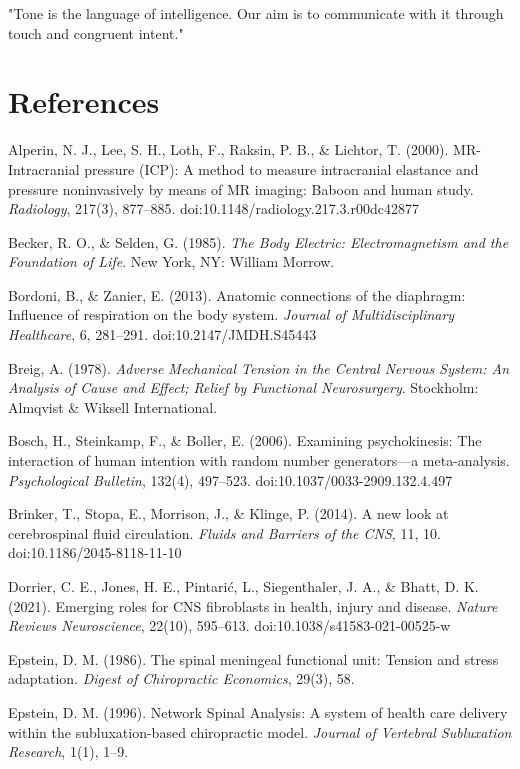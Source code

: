 \documentclass[11pt,letterpaper]{article}
\begin{document}
\begin{pullquotebox}
"Tone is the language of intelligence. Our aim is to communicate with it through touch and congruent intent."
\end{pullquotebox}


\section{References}

Alperin, N. J., Lee, S. H., Loth, F., Raksin, P. B., \& Lichtor, T. (2000). MR-Intracranial pressure (ICP): A method to measure intracranial elastance and pressure noninvasively by means of MR imaging: Baboon and human study. \textit{Radiology}, 217(3), 877–885. doi:10.1148/radiology.217.3.r00dc42877


Becker, R. O., \& Selden, G. (1985). \textit{The Body Electric: Electromagnetism and the Foundation of Life}. New York, NY: William Morrow.


Bordoni, B., \& Zanier, E. (2013). Anatomic connections of the diaphragm: Influence of respiration on the body system. \textit{Journal of Multidisciplinary Healthcare}, 6, 281–291. doi:10.2147/JMDH.S45443


Breig, A. (1978). \textit{Adverse Mechanical Tension in the Central Nervous System: An Analysis of Cause and Effect; Relief by Functional Neurosurgery}. Stockholm: Almqvist \& Wiksell International.


Bosch, H., Steinkamp, F., \& Boller, E. (2006). Examining psychokinesis: The interaction of human intention with random number generators—a meta-analysis. \textit{Psychological Bulletin}, 132(4), 497–523. doi:10.1037/0033-2909.132.4.497


Brinker, T., Stopa, E., Morrison, J., \& Klinge, P. (2014). A new look at cerebrospinal fluid circulation. \textit{Fluids and Barriers of the CNS}, 11, 10. doi:10.1186/2045-8118-11-10


Dorrier, C. E., Jones, H. E., Pintarić, L., Siegenthaler, J. A., \& Bhatt, D. K. (2021). Emerging roles for CNS fibroblasts in health, injury and disease. \textit{Nature Reviews Neuroscience}, 22(10), 595–613. doi:10.1038/s41583-021-00525-w


Epstein, D. M. (1986). The spinal meningeal functional unit: Tension and stress adaptation. \textit{Digest of Chiropractic Economics}, 29(3), 58.


Epstein, D. M. (1996). Network Spinal Analysis: A system of health care delivery within the subluxation-based chiropractic model. \textit{Journal of Vertebral Subluxation Research}, 1(1), 1–9.
\end{document}
